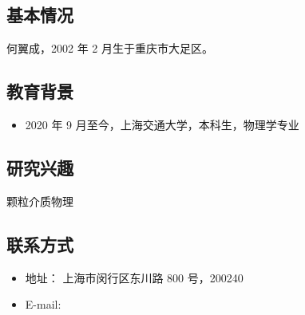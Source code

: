 
\begin{resume}
  \subsection*{基本情况}
    何翼成，2002 年 2 月生于重庆市大足区。

  \subsection*{教育背景}
  \begin{itemize}
    \item 2020 年 9 月至今，上海交通大学，本科生，物理学专业
  \end{itemize}

  \subsection*{研究兴趣}
    颗粒介质物理

  \subsection*{联系方式}
  \begin{itemize}
    \item 地址： 上海市闵行区东川路 800 号，200240
    \item E-mail: 
  \end{itemize}
\end{resume}
